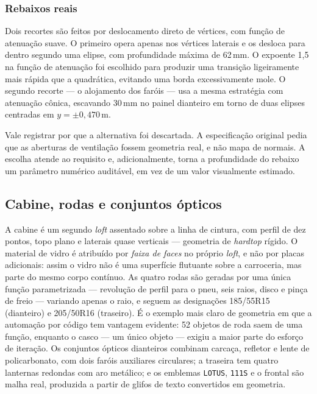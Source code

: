 \subsubsection{Rebaixos reais}

Dois recortes s\~ao feitos por deslocamento direto de v\'ertices, com fun\c{c}\~ao de
atenua\c{c}\~ao suave. O primeiro opera apenas nos v\'ertices laterais e os desloca para
dentro segundo uma elipse, com profundidade m\'axima de 62\,mm. O expoente 1,5 na
fun\c{c}\~ao de atenua\c{c}\~ao foi escolhido para produzir uma transi\c{c}\~ao ligeiramente
mais r\'apida que a quadr\'atica, evitando uma borda excessivamente mole. O segundo recorte
--- o alojamento dos far\'ois --- usa a mesma estrat\'egia com atenua\c{c}\~ao c\^onica,
escavando 30\,mm no painel dianteiro em torno de duas elipses centradas em
$y = \pm0{,}470$\,m.

Vale registrar por que a alternativa foi descartada. A especifica\c{c}\~ao original pedia
que as aberturas de ventila\c{c}\~ao fossem geometria real, e n\~ao mapa de normais. A
escolha atende ao requisito e, adicionalmente, torna a profundidade do rebaixo um
par\^ametro num\'erico audit\'avel, em vez de um valor visualmente estimado.

\subsection{Cabine, rodas e conjuntos \'opticos}

A cabine \'e um segundo \emph{loft} assentado sobre a linha de cintura, com perfil de dez
pontos, topo plano e laterais quase verticais --- geometria de \emph{hardtop} r\'igido. O
material de vidro \'e atribu\'ido por \emph{faixa de faces} no pr\'oprio \emph{loft}, e
n\~ao por placas adicionais: assim o vidro n\~ao \'e uma superf\'icie flutuante sobre a
carroceria, mas parte do mesmo corpo cont\'inuo. As quatro rodas s\~ao geradas por uma
\'unica fun\c{c}\~ao parametrizada --- revolu\c{c}\~ao de perfil para o pneu, seis raios,
disco e pin\c{c}a de freio --- variando apenas o raio, e seguem as
designa\c{c}\~oes 185/55R15 (dianteiro) e 205/50R16 (traseiro). \'E o exemplo mais claro
de geometria em que a automa\c{c}\~ao por c\'odigo tem vantagem evidente: 52 objetos de
roda saem de uma fun\c{c}\~ao, enquanto o casco --- um \'unico objeto --- exigiu a maior
parte do esfor\c{c}o de itera\c{c}\~ao. Os conjuntos \'opticos dianteiros combinam
carca\c{c}a, refletor e lente de policarbonato, com dois far\'ois auxiliares circulares; a
traseira tem quatro lanternas redondas com aro met\'alico; e os emblemas
\texttt{LOTUS}, \texttt{111S} e o frontal s\~ao malha real, produzida a partir de glifos
de texto convertidos em geometria.

